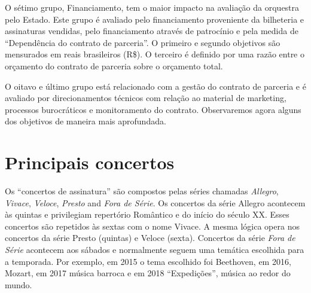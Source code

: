 \documentclass[a4paper, 12pt, openright, oneside, german, french, english, brazil]{abntex2}
\begin{document}
	O sétimo grupo, Financiamento, tem o maior impacto na avaliação da orquestra pelo Estado. Este grupo é avaliado pelo financiamento proveniente da bilheteria e assinaturas vendidas, pelo financiamento através de patrocínio e pela medida de ``Dependência do contrato de parceria''. O primeiro e segundo objetivos são mensurados em reais brasileiros (R\$). O terceiro é definido por uma razão entre o orçamento do contrato de parceria sobre o orçamento total.
	
	
	O oitavo e último grupo está relacionado com a gestão do contrato de parceria e é avaliado por direcionamentos técnicos com relação ao material de marketing, processos burocráticos e monitoramento do contrato. Observaremos agora alguns dos objetivos de maneira mais aprofundada.
	
	\section{Principais concertos}
	
	
	Os ``concertos de assinatura'' são compostos pelas séries chamadas \textit{Allegro}, \textit{Vivace}, \textit{Veloce}, \textit{Presto} and \textit{Fora de Série}. Os concertos da série Allegro acontecem às quintas e privilegiam repertório Romântico e do início do século XX. Esses concertos são repetidos às sextas com o nome Vivace. A mesma lógica opera nos concertos da série Presto (quintas) e Veloce (sexta). Concertos da série \textit{Fora de Série} acontecem aos sábados e normalmente seguem uma temática escolhida para a temporada. Por exemplo, em 2015 o tema escolhido foi Beethoven, em 2016, Mozart, em 2017 música barroca e em 2018 ``Expedições'', música ao redor do mundo.
	
\end{document}
